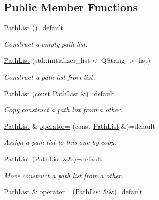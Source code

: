 \subsection*{Public Member Functions}
\begin{DoxyCompactItemize}
\item 
\hyperlink{class_mdt_1_1_deploy_utils_1_1_path_list_a4a415acb1aa87350536e9e34980ed7fe}{Path\+List} ()=default
\begin{DoxyCompactList}\small\item\em Construct a empty path list. \end{DoxyCompactList}\item 
\hyperlink{class_mdt_1_1_deploy_utils_1_1_path_list_adc70e99b4aabb7edd3c6ad03a15117a8}{Path\+List} (std\+::initializer\+\_\+list$<$ Q\+String $>$ list)
\begin{DoxyCompactList}\small\item\em Construct a path list from {\itshape list}. \end{DoxyCompactList}\item 
\hyperlink{class_mdt_1_1_deploy_utils_1_1_path_list_a904588c5a1ad74269af5418749e6f8fc}{Path\+List} (const \hyperlink{class_mdt_1_1_deploy_utils_1_1_path_list}{Path\+List} \&)=default
\begin{DoxyCompactList}\small\item\em Copy construct a path list from a other. \end{DoxyCompactList}\item 
\hyperlink{class_mdt_1_1_deploy_utils_1_1_path_list}{Path\+List} \& \hyperlink{class_mdt_1_1_deploy_utils_1_1_path_list_a5be033c921bce08dff33e25122ea3def}{operator=} (const \hyperlink{class_mdt_1_1_deploy_utils_1_1_path_list}{Path\+List} \&)=default
\begin{DoxyCompactList}\small\item\em Assign a path list to this one by copy. \end{DoxyCompactList}\item 
\hyperlink{class_mdt_1_1_deploy_utils_1_1_path_list_aa18f629ded1d797c13d61165b8749bf6}{Path\+List} (\hyperlink{class_mdt_1_1_deploy_utils_1_1_path_list}{Path\+List} \&\&)=default
\begin{DoxyCompactList}\small\item\em Move construct a path list from a other. \end{DoxyCompactList}\item 
\hyperlink{class_mdt_1_1_deploy_utils_1_1_path_list}{Path\+List} \& \hyperlink{class_mdt_1_1_deploy_utils_1_1_path_list_a8f96ea72207a6a869edeff57dbeed43a}{operator=} (\hyperlink{class_mdt_1_1_deploy_utils_1_1_path_list}{Path\+List} \&\&)=default

\end{DoxyCompactItemize}
